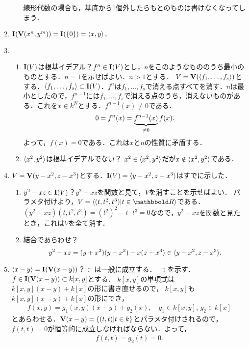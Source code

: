 \documentclass[9pt]{ltjsarticle}
\theoremstyle{break}
\theoremstyle{break}
\theoremstyle{break}
\theoremstyle{break}
\theoremstyle{break}
\theoremstyle{break}
\theoremstyle{break}
\theoremstyle{break}
\theoremstyle{break}
\theoremstyle{break}
\theoremstyle{break}
\theoremstyle{break}
\theoremstyle{break}
\theoremstyle{break}
\theoremstyle{break}
\theoremstyle{nonumberbreak}
\theoremstyle{nonumberbreak}
\begin{document}
\begin{enumerate}[label=(問題\arabic*)]
\begin{enumerate}[label=(\alph*)]
線形代数の場合も，基底から1個外したらもとのものは書けなくなってしまう．
\end{enumerate}
 \item $\textbf I(\textbf V(x^n,y^m))=\textbf I(\{0\})=\langle x,y \rangle$．
 \item
\begin{enumerate}[label=(\alph*)]
 \item $\textbf I(V)$は根基イデアル？$f^n \in \textbf I(V)$とし，$n$をこのようなもののうち最小のものとする．$n=1$を示せばよい．$n>1$とする．  $V=\textbf V(\langle f_1,\dots,f_s \rangle)$とする．$\langle f_1,\dots,f_s \rangle\subset \textbf I(V)$．$f^n$は$f_1,\dots,f_s$で消える点すべてを消す．$n$は最小としたので，$f^{n-1}$には$f_1,\dots,f_s$で消える点のうち，消えないものがある．これを$x\in k^N$とする．$f^{n-1}(x)\neq 0$である．
\begin{align}
 0 = f^n(x) = \underbrace{f^{n-1}(x)}_{\neq 0}f(x).
\end{align}
よって，$f(x)=0$である．これは$x$と$n$の性質に矛盾する．
 \item $\langle x^2,y^2 \rangle$は根基イデアルでない？
$x^2 \in \langle x^2,y^2 \rangle$だが$x\notin \langle x^2,y^2 \rangle$である．
\end{enumerate}
 \item $V=\textbf V(y-x^2,z-x^3)$とする．$\textbf I(V)=\langle y-x^2,z-x^3 \rangle$はすでに示した．
\begin{enumerate}[label=(\alph*)]
 \item $y^2-xz \in \textbf I(V)$？$y^2-xz$を関数と見て，$V$を消すことを示せばよい．
パラメタ付けより，$V=\gen{(t,t^2,t^3)|t\in \R}$である．$(y^2-xz)(t,t^2,t^3)=(t^2)^2 - t\cdot t^3 = 0$なので，$y^2-xz$を関数と見たとき，これは$V$を全て消す．
 \item 結合であらわせ？
\begin{align}
 y^2-xz =  (y+x^2)(y-x^2) - x(z-x^3) \in \langle y-x^2,z-x^3 \rangle.
\end{align}
\end{enumerate}
 \item $\langle x-y \rangle=\textbf I(\textbf V(x-y))$？$\subset$は一般に成立する．
$\supset$を示す．$f\in \textbf I(\textbf V(x-y))\subset k[x,y]$とする．
$k[x,y]$の単項式は$k[x,y](x-y) + k[x]$の形に書き直せるので，
$k[x,y]$も$k[x,y](x-y)+k[x]$の形にでき，
\begin{align}
 f(x,y) = g_1(x,y)(x-y) + g_2(x),\quad g_1\in k[x,y],\, g_2\in k[x]
\end{align}
とあらわせる．$\textbf V(x-y)=\left\{(t,t)|t\in k\right\}$とパラメタ付けされるので，
$f(t,t)=0$が恒等的に成立しなければならない．よって，
\begin{align}
 f(t,t) = g_2(t) = 0.
\end{align}

\end{enumerate}
\end{document}
